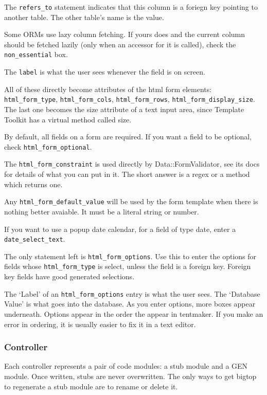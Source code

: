 The \verb+refers_to+ statement indicates that this column is a foriegn
key pointing to another table.  The other table's name is the value.

Some ORMs use lazy column fetching.  If yours does and the current column
should be fetched lazily (only when an accessor for it is called), check
the \verb+non_essential+ box.

The \verb+label+ is what the user sees whenever the field is on screen.

All of these directly become attributes of the html form elements:
\verb+html_form_type+, \verb+html_form_cols+, \verb+html_form_rows+,
\verb+html_form_display_size+.  The last one becomes the size attribute
of a text input area, since Template Toolkit has a virtual method called
size.

By default, all fields on a form are required.  If you want a field
to be optional, check \verb+html_form_optional+.

The \verb+html_form_constraint+ is used directly by Data::FormValidator,
see its docs for details of what you can put in it.  The short answer
is a regex or a method which returns one.

Any \verb+html_form_default_value+ will be used by the form template
when there is nothing better avaiable.  It must be a literal string or number.

If you want to use a popup date calendar, for a field of type date,
enter a \verb+date_select_text+.

The only statement left is \verb+html_form_options+.  Use this to
enter the options for fields whose \verb+html_form_type+ is select,
unless the field is a foreign key.  Foreign key fields have good
generated selections.

The `Label' of an \verb+html_form_options+ entry is what the user
sees.  The `Database Value' is what goes into the database.  As you
enter options, more boxes appear underneath.  Options appear in the
order the appear in tentmaker.  If you make an error in ordering,
it is usually easier to fix it in a text editor.

\subsubsection*{Controller}

Each controller represents a pair of code modules: a stub module and a GEN
module.  Once written, stubs are never overwritten.  The only ways to get
bigtop to regenerate a stub module are to rename or delete it.

